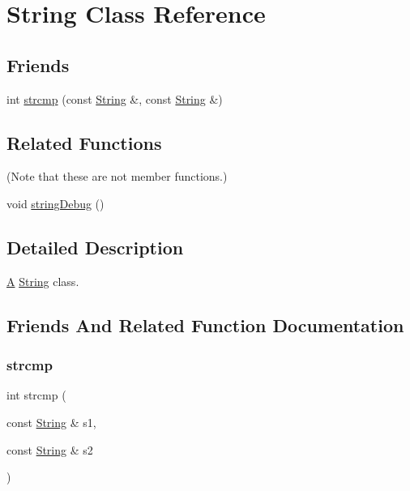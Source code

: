 \hypertarget{class_string}{}\section{String Class Reference}
\label{class_string}
\subsection*{Friends}
\begin{DoxyCompactItemize}
\item 
int \mbox{\hyperlink{class_string_ae3c243f0bc797b9e4b15d2ef5e5aaa7c}{strcmp}} (const \mbox{\hyperlink{class_string}{String}} \&, const \mbox{\hyperlink{class_string}{String}} \&)
\end{DoxyCompactItemize}
\subsection*{Related Functions}
(Note that these are not member functions.) \begin{DoxyCompactItemize}
\item 
void \mbox{\hyperlink{class_string_a5c07384b505d25ae6f61fc7abf0b0e61}{string\+Debug}} ()
\end{DoxyCompactItemize}


\subsection{Detailed Description}
\mbox{\hyperlink{class_a}{A}} \mbox{\hyperlink{class_string}{String}} class. 

\subsection{Friends And Related Function Documentation}
\mbox{\label{class_string_ae3c243f0bc797b9e4b15d2ef5e5aaa7c}} 
\subsubsection{\texorpdfstring{strcmp}{strcmp}}
{\footnotesize\ttfamily int strcmp (\begin{DoxyParamCaption}\item[{const \mbox{\hyperlink{class_string}{String}} \&}]{s1,  }\item[{const \mbox{\hyperlink{class_string}{String}} \&}]{s2 }\end{DoxyParamCaption})\hspace{0.3cm}{\ttfamily [friend]}}


